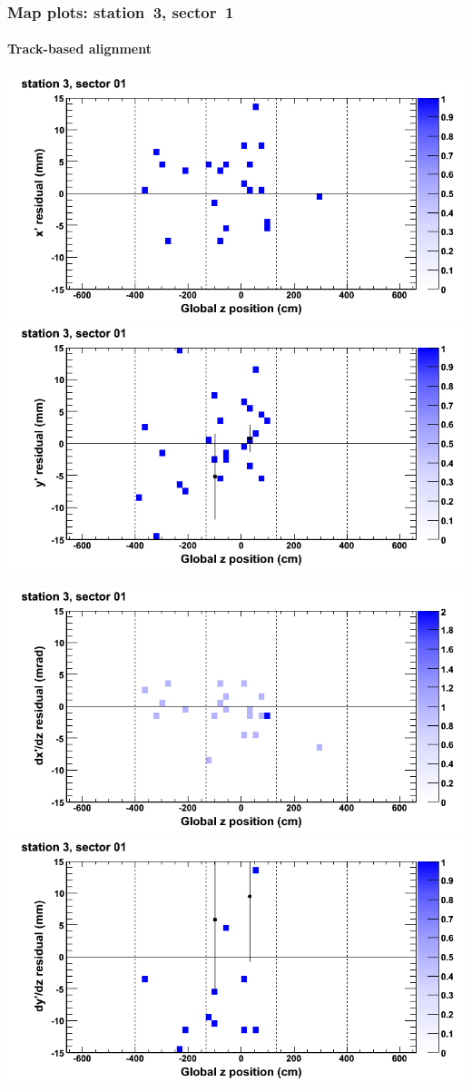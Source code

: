 \documentclass[compress]{beamer}
\begin{document}
\begin{frame}
\frametitle{Map plots: station~3, sector~1}
\framesubtitle{Track-based alignment}
\includegraphics[width=0.5\linewidth]{mapplots_re05/DTvsz_st3sec01_x.png}
\includegraphics[width=0.5\linewidth]{mapplots_re05/DTvsz_st3sec01_y.png}

\includegraphics[width=0.5\linewidth]{mapplots_re05/DTvsz_st3sec01_dxdz.png}
\includegraphics[width=0.5\linewidth]{mapplots_re05/DTvsz_st3sec01_dydz.png}
\end{frame}
\end{document}
